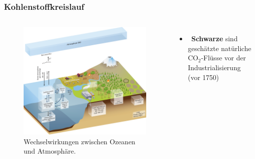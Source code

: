 \begin{frame}
	\frametitle{Kohlenstoffkreislauf}
	\begin{columns}
		\begin{figure}
			\centering
			\includegraphics[width=0.9\linewidth]{bilder/kohlenstoff/cycle_arrows-ocean-and-atmosphere.png}
			\caption{Wechselwirkungen zwischen Ozeanen und Atmosphäre.}
		\end{figure}
		\begin{itemize}
			\item [] \textbf{Schwarze \rightarrow} sind geschätzte natürliche CO$_2$-Flüsse vor der Industrialisierung (vor 1750)
		\end{itemize}
	\end{columns}
\end{frame}

